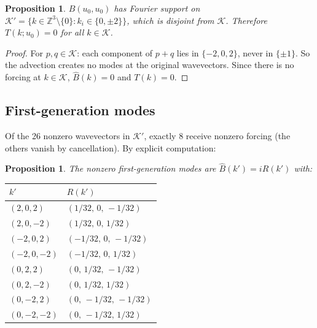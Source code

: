 \documentclass[11pt]{article}
\newtheorem{proposition}[theorem]{Proposition}
\theoremstyle{definition}
\newcommand{\Z}{\mathbb{Z}}
\newcommand{\cK}{\mathcal{K}}
\begin{document}
\begin{proposition}\label{prop:gen1}
$B(u_0,u_0)$ has Fourier support on
$\cK'=\{k\in\Z^3\setminus\{0\}: k_i\in\{0,\pm 2\}\}$,
which is disjoint from $\cK$.  Therefore $T(k;u_0)=0$
for all $k\in\cK$.
\end{proposition}

\begin{proof}
For $p,q\in\cK$: each component of $p+q$ lies in
$\{-2,0,2\}$, never in $\{\pm 1\}$.  So the advection
creates no modes at the original wavevectors.
Since there is no forcing at $k\in\cK$,
$\hat B(k) = 0$ and $T(k) = 0$.
\end{proof}

\subsection{First-generation modes}

Of the 26 nonzero wavevectors in $\cK'$, exactly 8
receive nonzero forcing (the others vanish by
cancellation).  By explicit computation:

\begin{proposition}\label{prop:gen1-modes}
The nonzero first-generation modes are
$\hat B(k') = iR(k')$ with:
\begin{center}
\begin{tabular}{@{}ll@{}}
\toprule
$k'$ & $R(k')$ \\
\midrule
$(2,0,2)$   & $(1/32,\,0,\,-1/32)$ \\
$(2,0,-2)$  & $(1/32,\,0,\,1/32)$ \\
$(-2,0,2)$  & $(-1/32,\,0,\,-1/32)$ \\
$(-2,0,-2)$ & $(-1/32,\,0,\,1/32)$ \\
$(0,2,2)$   & $(0,\,1/32,\,-1/32)$ \\
$(0,2,-2)$  & $(0,\,1/32,\,1/32)$ \\
$(0,-2,2)$  & $(0,\,-1/32,\,-1/32)$ \\
$(0,-2,-2)$ & $(0,\,-1/32,\,1/32)$ \\
\bottomrule
\end{tabular}
\end{center}
\end{proposition}
\end{document}
